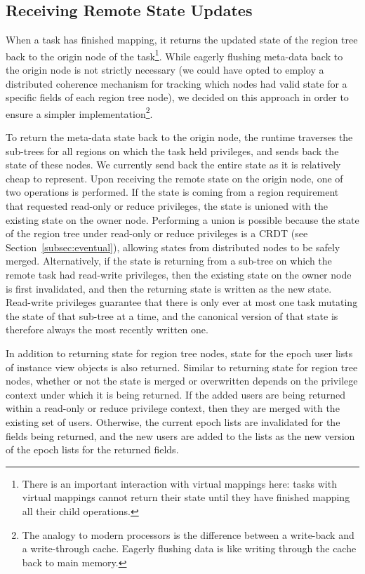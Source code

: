 \subsection{Receiving Remote State Updates}
\label{subsec:receivestate}

When a task has finished mapping, it returns the
updated state of the region tree back to the origin
node of the task\footnote{There is an important interaction
with virtual mappings here: tasks with virtual 
mappings cannot return their state until they have
finished mapping all their child operations.}. While 
eagerly flushing meta-data back to the origin node
is not strictly necessary
(we could have opted to employ a distributed coherence
mechanism for tracking which nodes had valid state
for a specific fields of each region tree node), we 
decided on this approach in order to ensure a
simpler implementation\footnote{The analogy to modern
processors is the difference between a write-back
and a write-through cache. Eagerly flushing data is
like writing through the cache back to main memory.}.

To return the meta-data state back to the origin 
node, the runtime traverses the sub-trees for
all regions on which the task held privileges, and
sends back the state of these nodes. We currently
send back the entire state as it is relatively cheap
to represent.  Upon receiving the remote state on
the origin node, one of two operations is performed.
If the state is coming from a region requirement that
requested read-only or reduce privileges, the state
is unioned with the existing state on the owner node.
Performing a union is possible because the state of
the region tree under read-only or reduce privileges
is a CRDT (see Section~\ref{subsec:eventual}), allowing
states from distributed nodes to be safely merged.
Alternatively, if the state is returning from a sub-tree
on which the remote task had read-write privileges, 
then the existing state on the owner node is first
invalidated, and then the returning state is 
written as the new state. Read-write privileges
guarantee that there is only ever at most one task
mutating the state of that sub-tree at a time,
and the canonical version of that state is therefore
always the most recently written one.

In addition to returning state for region tree
nodes, state for the epoch user lists of instance
view objects is also returned.  Similar to returning
state for region tree nodes, whether or not the
state is merged or overwritten depends on the privilege
context under which it is being returned. If the
added users are being returned within a read-only
or reduce privilege context, then they are merged
with the existing set of users.  Otherwise, the
current epoch lists are invalidated for the fields
being returned, and the new users are added to the
lists as the new version of the epoch lists for
the returned fields.

